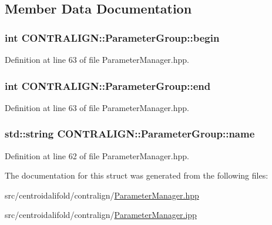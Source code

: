 \subsection{Member Data Documentation}
\hypertarget{struct_c_o_n_t_r_a_l_i_g_n_1_1_parameter_group_a01e00b1d2abfda8cdce842800306ad0f}{
\subsubsection[{begin}]{\setlength{\rightskip}{0pt plus 5cm}int C\+O\+N\+T\+R\+A\+L\+I\+G\+N\+::\+Parameter\+Group\+::begin}}\label{struct_c_o_n_t_r_a_l_i_g_n_1_1_parameter_group_a01e00b1d2abfda8cdce842800306ad0f}


Definition at line 63 of file Parameter\+Manager.\+hpp.

\hypertarget{struct_c_o_n_t_r_a_l_i_g_n_1_1_parameter_group_ae458d3b09c3bad4aa3c0827c5ecf8c60}{
\subsubsection[{end}]{\setlength{\rightskip}{0pt plus 5cm}int C\+O\+N\+T\+R\+A\+L\+I\+G\+N\+::\+Parameter\+Group\+::end}}\label{struct_c_o_n_t_r_a_l_i_g_n_1_1_parameter_group_ae458d3b09c3bad4aa3c0827c5ecf8c60}


Definition at line 63 of file Parameter\+Manager.\+hpp.

\hypertarget{struct_c_o_n_t_r_a_l_i_g_n_1_1_parameter_group_adb73e76d451ef904109962ea5f77f52e}{
\subsubsection[{name}]{\setlength{\rightskip}{0pt plus 5cm}std\+::string C\+O\+N\+T\+R\+A\+L\+I\+G\+N\+::\+Parameter\+Group\+::name}}\label{struct_c_o_n_t_r_a_l_i_g_n_1_1_parameter_group_adb73e76d451ef904109962ea5f77f52e}


Definition at line 62 of file Parameter\+Manager.\+hpp.



The documentation for this struct was generated from the following files\+:\begin{DoxyCompactItemize}
\item 
src/centroidalifold/contralign/\hyperlink{centroidalifold_2contralign_2_parameter_manager_8hpp}{Parameter\+Manager.\+hpp}\item 
src/centroidalifold/contralign/\hyperlink{centroidalifold_2contralign_2_parameter_manager_8ipp}{Parameter\+Manager.\+ipp}\end{DoxyCompactItemize}
